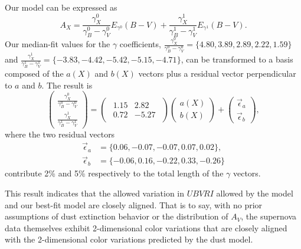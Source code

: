 \documentclass{aastex61}   	%
\begin{document}
Our model can be expressed as
\begin{equation}
A_X = \frac{\gamma^0_X}{\gamma^0_B-\gamma^0_V}  E_{\gamma^0}(B-V) +  \frac{\gamma^1_X}{\gamma^1_B-\gamma^1_V}  E_{\gamma^1}(B-V).
\end{equation}
Our median-fit values for the $\gamma$ coefficients,
$\frac{\gamma^0_X}{\gamma^0_B-\gamma^0_V}  =\{4.80 ,   3.89,   2.89,   2.22,   1.59\}$ and
$ \frac{\gamma^1_X}{\gamma^1_B-\gamma^1_V}=\{-3.83 ,  -4.42,  -5.42,  -5.15,  -4.71\}$,
can be transformed to a basis composed of the $a(X)$ and $b(X)$ vectors plus a residual vector perpendicular to $a$ and $b$.
The result is
\begin{equation}
\begin{pmatrix}
 \frac{\gamma^0_X}{\gamma^0_B-\gamma^0_V} \\
\frac{\gamma^1_X}{\gamma^1_B-\gamma^1_V} 
\end{pmatrix}=
\begin{pmatrix}
\begin{array}{rr}
1.15 & 2.82 \\
0.72 & -5.27
\end{array}
\end{pmatrix} 
\begin{pmatrix}
a(X) \\
b(X)
\end{pmatrix}+
\begin{pmatrix}
\vec{\epsilon}_a \\
\vec{\epsilon}_b
\end{pmatrix},
\label{trans_I:eqn}
\end{equation}
where the two residual vectors
\begin{align}
\vec{\epsilon}_a &=\{0.06, -0.07, -0.07,  0.07, 0.02\}, \\
\vec{\epsilon}_b & =\{-0.06, 0.16, -0.22, 0.33, -0.26\}
\label{res_I:eqn}
\end{align}
contribute  2\% and 5\% respectively to the total  length of the $\gamma$ vectors.

This result indicates that
the allowed variation in $UBVRI$ allowed by the  model and our best-fit model are closely aligned.
That is to say, with no prior assumptions of dust extinction behavior or the distribution of $A_V$, the supernova data themselves exhibit
2-dimensional color variations that are closely aligned with the 2-dimensional color variations predicted by the  dust model.
\end{document}
